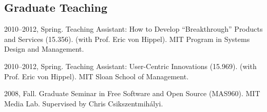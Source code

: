 \documentclass[10pt]{article}
\newenvironment{cvlist}{
\begin{list}{}{\leftmargin=3.0em \itemindent=-3.0em}
  \setlength{\itemsep}{0pt}
  \setlength{\parskip}{0em}
  \setlength{\parsep}{1em}
  \setlength{\parindent}{0em}}
{\vspace{1em}
\end{list}}
\begin{document}
\subsection{Graduate Teaching}
\begin{cvlist}
\item 2010--2012, Spring. Teaching Assistant: How to Develop ``Breakthrough'' Products and Services (15.356). (with Prof. Eric von Hippel). MIT Program in Systems Design and Management.
\item 2010--2012, Spring. Teaching Assistant: User-Centric Innovations (15.969). (with Prof. Eric von Hippel). MIT Sloan School of Management.
\item 2008, Fall. Graduate Seminar in Free Software and Open Source (MAS960). MIT Media Lab. Supervised by Chris Csikszentmihályi.
\end{cvlist}




\end{document}
